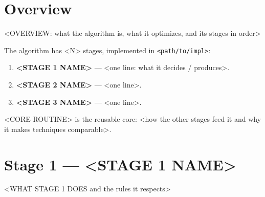 \section{Overview}
<OVERVIEW: what the algorithm is, what it optimizes, and its stages in order>

The algorithm has <N> stages, implemented in \texttt{<path/to/impl>}:
\begin{enumerate}
  \item \textbf{<STAGE 1 NAME>} --- <one line: what it decides / produces>.
  \item \textbf{<STAGE 2 NAME>} --- <one line>.
  \item \textbf{<STAGE 3 NAME>} --- <one line>.
\end{enumerate}

<CORE ROUTINE> is the reusable core: <how the other stages feed it and why it
makes techniques comparable>.


\section{Stage 1 --- <STAGE 1 NAME>}
<WHAT STAGE 1 DOES and the rules it respects>

